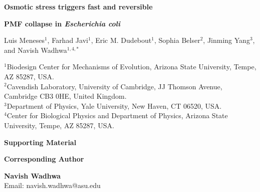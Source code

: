 \documentclass[11pt]{article}
\newcommand{\beginsupplement}{
    \setcounter{table}{0}
    \renewcommand{\thetable}{S\arabic{table}}
    \setcounter{figure}{0}
    \renewcommand{\thefigure}{S\arabic{figure}}
}
\begin{document}
\renewcommand{\thepage}{S-\arabic{page}}

\pagestyle{fancy}
\fancyhf{}                  %
\fancyhead[R]{\thepage}     %
\renewcommand{\headrulewidth}{0pt}  %
\renewcommand{\footrulewidth}{0pt}
\beginsupplement

\renewcommand\figurename{Supplemental Figure}
\renewcommand\tablename{Supplemental Table}

\begin{center}

{\LARGE\bfseries Osmotic stress triggers fast and reversible}

\vspace{0.3em}
{\LARGE\bfseries PMF collapse in \textit{Escherichia coli}}

\vspace{10em}

\end{center}

{\normalsize Luis Meneses$^{1}$, Farhad Javi$^{1}$, Eric M. Dudebout$^{1}$, 
Sophia Belser$^{2}$, Jinming Yang$^{3}$, and Navish Wadhwa$^{1,4,*}$}

\vspace{2em}

{\small
$^{1}$Biodesign Center for Mechanisms of Evolution, Arizona State University, Tempe, AZ 85287, USA.\\
$^{2}$Cavendish Laboratory, University of Cambridge, JJ Thomson Avenue, Cambridge CB3 0HE, United Kingdom.\\
$^{3}$Department of Physics, Yale University, New Haven, CT 06520, USA.\\
$^{4}$Center for Biological Physics and Department of Physics, Arizona State University, Tempe, AZ 85287, USA.
}

\vspace{3em}

\begin{center}

{\LARGE\bfseries Supporting Material}

\end{center}


\vspace{2em}

{\bfseries Corresponding Author}

\vspace{0.5em}
{\small \textbf{Navish Wadhwa}\\ Email: navish.wadhwa@asu.edu}
\end{document}
